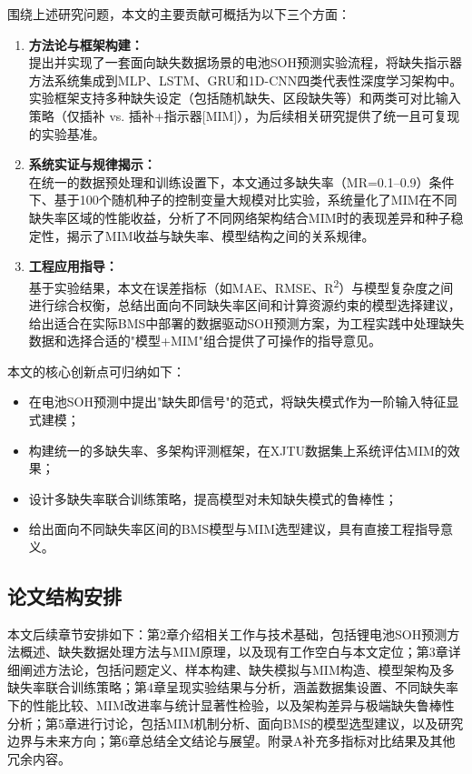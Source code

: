 \documentclass[10pt,a4paper]{ctexart}
\begin{document}
围绕上述研究问题，本文的主要贡献可概括为以下三个方面：

\begin{enumerate}[label=(\arabic*)]
    \item \textbf{方法论与框架构建：}\\
    提出并实现了一套面向缺失数据场景的电池SOH预测实验流程，将缺失指示器方法系统集成到MLP、LSTM、GRU和1D-CNN四类代表性深度学习架构中。实验框架支持多种缺失设定（包括随机缺失、区段缺失等）和两类可对比输入策略（仅插补 vs. 插补+指示器[MIM]），为后续相关研究提供了统一且可复现的实验基准。
    
    \item \textbf{系统实证与规律揭示：}\\
    在统一的数据预处理和训练设置下，本文通过多缺失率（MR=0.1--0.9）条件下、基于100个随机种子的控制变量大规模对比实验，系统量化了MIM在不同缺失率区域的性能收益，分析了不同网络架构结合MIM时的表现差异和种子稳定性，揭示了MIM收益与缺失率、模型结构之间的关系规律。
    
    \item \textbf{工程应用指导：}\\
    基于实验结果，本文在误差指标（如MAE、RMSE、R\textsuperscript{2}）与模型复杂度之间进行综合权衡，总结出面向不同缺失率区间和计算资源约束的模型选择建议，给出适合在实际BMS中部署的数据驱动SOH预测方案，为工程实践中处理缺失数据和选择合适的"模型+MIM"组合提供了可操作的指导意见。
\end{enumerate}

本文的核心创新点可归纳如下：
\begin{itemize}
    \item 在电池SOH预测中提出"缺失即信号"的范式，将缺失模式作为一阶输入特征显式建模；
    \item 构建统一的多缺失率、多架构评测框架，在XJTU数据集上系统评估MIM的效果；
    \item 设计多缺失率联合训练策略，提高模型对未知缺失模式的鲁棒性；
    \item 给出面向不同缺失率区间的BMS模型与MIM选型建议，具有直接工程指导意义。
\end{itemize}

\subsection{论文结构安排}

本文后续章节安排如下：第2章介绍相关工作与技术基础，包括锂电池SOH预测方法概述、缺失数据处理方法与MIM原理，以及现有工作空白与本文定位；第3章详细阐述方法论，包括问题定义、样本构建、缺失模拟与MIM构造、模型架构及多缺失率联合训练策略；第4章呈现实验结果与分析，涵盖数据集设置、不同缺失率下的性能比较、MIM改进率与统计显著性检验，以及架构差异与极端缺失鲁棒性分析；第5章进行讨论，包括MIM机制分析、面向BMS的模型选型建议，以及研究边界与未来方向；第6章总结全文结论与展望。附录A补充多指标对比结果及其他冗余内容。
\end{document}
